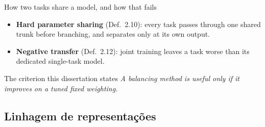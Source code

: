\documentclass{beamer}
\begin{document}
\begin{frame}{How two tasks share a model, and how that fails}
    \begin{itemize}
        \item \textbf{Hard parameter sharing} (Def.~2.10): every task passes through one shared
              trunk before branching, and separates only at its own output.
        \item \textbf{Negative transfer} (Def.~2.12): joint training leaves a task worse than its
              dedicated single-task model.
    \end{itemize}

    \begin{exampleblock}{The criterion this dissertation states}
        \textit{A balancing method is useful only if it improves on a tuned fixed weighting.}
    \end{exampleblock}
\end{frame}

\subsection{Linhagem de representações}
\end{document}
